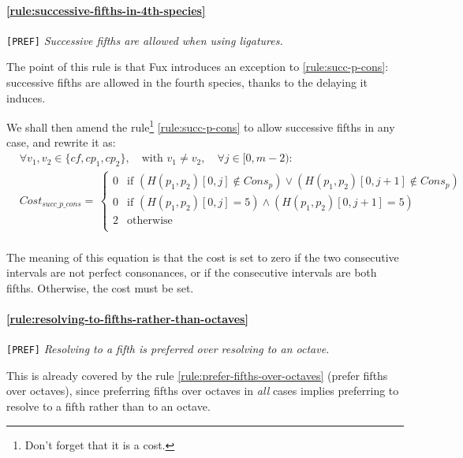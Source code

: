 \paragraph{\hspace{.6cm}\ref{rule:successive-fifths-in-4th-species}} \texttt{[PREF]} \textit{Successive fifths are allowed when using ligatures.}    

    The point of this rule is that Fux introduces an exception to \ref{rule:succ-p-cons}: successive fifths are allowed in the fourth species, thanks to the delaying it induces.

    We shall then amend the rule\footnote{Don't forget that it is a cost.} \ref{rule:succ-p-cons} to allow successive fifths in any case, and rewrite it as:
    \begin{equation} \begin{aligned}
        &\forall v_1, v_2 \in \{cf, cp_1, cp_2\}, \quad \text{with } v_1 \neq v_2, \quad \forall j \in [0, m-2) \colon\\
        &Cost_{succ\_p\_cons} = \,  
        \begin{cases}
            0 & \text{if } (H(p_1, p_2)[0, j] \notin Cons_p) \lor (H(p_1, p_2)[0, j+1] \notin Cons_p)\\
            0 & \text{if } (H(p_1, p_2)[0, j] = 5 ) \land (H(p_1, p_2)[0, j+1] = 5) \\
            2 & \text{otherwise } \\
        \end{cases}\\
    \end{aligned} \end{equation}

    The meaning of this equation is that the cost is set to zero if the two consecutive intervals are not perfect consonances, or if the consecutive intervals are both fifths. Otherwise, the cost must be set.

    \paragraph{\hspace{.6cm}\ref{rule:resolving-to-fifths-rather-than-octaves}} \texttt{[PREF]} \textit{Resolving to a fifth is preferred over resolving to an octave.}    
    
    This is already covered by the rule \ref{rule:prefer-fifths-over-octaves} (prefer fifths over octaves), since preferring fifths over octaves in \textit{all} cases implies preferring to resolve to a fifth rather than to an octave.

